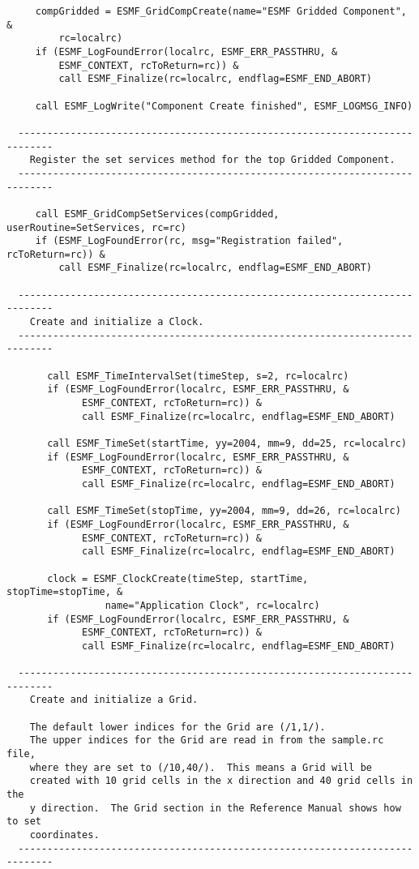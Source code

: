 \begin{verbatim}
     compGridded = ESMF_GridCompCreate(name="ESMF Gridded Component", &
         rc=localrc)
     if (ESMF_LogFoundError(localrc, ESMF_ERR_PASSTHRU, &
         ESMF_CONTEXT, rcToReturn=rc)) &
         call ESMF_Finalize(rc=localrc, endflag=ESMF_END_ABORT)
 
     call ESMF_LogWrite("Component Create finished", ESMF_LOGMSG_INFO)
 
  ----------------------------------------------------------------------------
    Register the set services method for the top Gridded Component.
  ----------------------------------------------------------------------------
 
     call ESMF_GridCompSetServices(compGridded, userRoutine=SetServices, rc=rc)
     if (ESMF_LogFoundError(rc, msg="Registration failed", rcToReturn=rc)) &
         call ESMF_Finalize(rc=localrc, endflag=ESMF_END_ABORT)
 
  ----------------------------------------------------------------------------
    Create and initialize a Clock.
  ----------------------------------------------------------------------------
 
       call ESMF_TimeIntervalSet(timeStep, s=2, rc=localrc)
       if (ESMF_LogFoundError(localrc, ESMF_ERR_PASSTHRU, &
             ESMF_CONTEXT, rcToReturn=rc)) &
             call ESMF_Finalize(rc=localrc, endflag=ESMF_END_ABORT)
 
       call ESMF_TimeSet(startTime, yy=2004, mm=9, dd=25, rc=localrc)
       if (ESMF_LogFoundError(localrc, ESMF_ERR_PASSTHRU, &
             ESMF_CONTEXT, rcToReturn=rc)) &
             call ESMF_Finalize(rc=localrc, endflag=ESMF_END_ABORT)
 
       call ESMF_TimeSet(stopTime, yy=2004, mm=9, dd=26, rc=localrc)
       if (ESMF_LogFoundError(localrc, ESMF_ERR_PASSTHRU, &
             ESMF_CONTEXT, rcToReturn=rc)) &
             call ESMF_Finalize(rc=localrc, endflag=ESMF_END_ABORT)
 
       clock = ESMF_ClockCreate(timeStep, startTime, stopTime=stopTime, &
                 name="Application Clock", rc=localrc)
       if (ESMF_LogFoundError(localrc, ESMF_ERR_PASSTHRU, &
             ESMF_CONTEXT, rcToReturn=rc)) &
             call ESMF_Finalize(rc=localrc, endflag=ESMF_END_ABORT)
 
  ----------------------------------------------------------------------------
    Create and initialize a Grid.
  
    The default lower indices for the Grid are (/1,1/).
    The upper indices for the Grid are read in from the sample.rc file,
    where they are set to (/10,40/).  This means a Grid will be
    created with 10 grid cells in the x direction and 40 grid cells in the
    y direction.  The Grid section in the Reference Manual shows how to set
    coordinates.
  ----------------------------------------------------------------------------
 

\end{verbatim}
